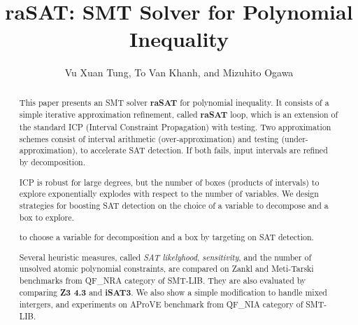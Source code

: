 \documentclass[runningheads,a4paper,oribibl]{llncs}
\begin{document}
%
\title{{\bf raSAT}: SMT Solver for Polynomial Inequality}

\author{Vu Xuan Tung, To Van Khanh, and Mizuhito Ogawa} 


\maketitle

\begin{abstract}
This paper presents an SMT solver {\bf raSAT} for polynomial inequality. 
It consists of a simple iterative approximation refinement, called {\bf raSAT} loop, 
which is an extension of the standard ICP (Interval Constraint Propagation) with testing. 
Two approximation schemes consist of interval arithmetic (over-approximation) and 
testing (under-approximation), to accelerate SAT detection. 
If both fails, input intervals are refined by decomposition. 

ICP is robust for large degrees, but the number of boxes (products of intervals) to explore 
exponentially explodes with respect to the number of variables. 
We design strategies for boosting SAT detection on the choice of a variable to decompose
and a box to explore. 

to choose a variable for decomposition and a box by 
targeting on SAT detection. 

Several heuristic measures, called {\em SAT likelyhood}, {\em sensitivity}, and the number of 
unsolved atomic polynomial constraints, are compared on Zankl and Meti-Tarski benchmarks from 
QF\_NRA category of SMT-LIB. They are also evaluated by comparing {\bf Z3 4.3} and {\bf iSAT3}. 
We also show a simple modification to handle mixed intergers, and experiments on 
AProVE benchmark from QF\_NIA category of SMT-LIB. 
\end{abstract}

\end{document}
